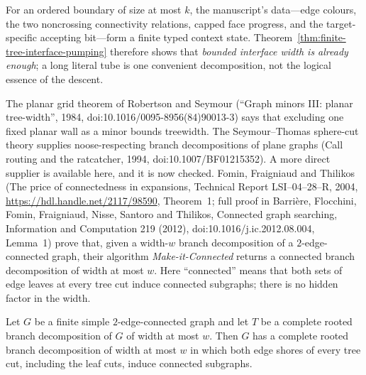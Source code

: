 For an ordered boundary of size at most \(k\), the manuscript's data---edge
colours, the two noncrossing connectivity relations, capped face progress,
and the target-specific accepting bit---form a finite typed context state.
Theorem~\ref{thm:finite-tree-interface-pumping} therefore shows that
\emph{bounded interface width is already enough}; a long literal tube is one
convenient decomposition, not the logical essence of the descent.

The planar grid theorem of Robertson and Seymour
(``Graph minors III: planar tree-width'', 1984,
doi:10.1016/0095-8956(84)90013-3) says that excluding one fixed planar
wall as a minor bounds treewidth.  The Seymour--Thomas sphere-cut theory
supplies noose-respecting branch decompositions of plane graphs
(Call routing and the ratcatcher, 1994,
doi:10.1007/BF01215352).  A more direct supplier is available here, and it
is now checked.
Fomin, Fraigniaud and Thilikos (The price of connectedness in expansions,
Technical Report LSI--04--28--R, 2004,
\url{https://hdl.handle.net/2117/98590}, Theorem~1; full proof in
Barri\`ere, Flocchini, Fomin, Fraigniaud, Nisse, Santoro and Thilikos,
Connected graph searching, Information and Computation 219 (2012),
doi:10.1016/j.ic.2012.08.004, Lemma~1) prove that, given a width-$w$
branch decomposition of a \(2\)-edge-connected graph, their algorithm
\emph{Make-it-Connected} returns a connected branch decomposition of width
at most $w$.  Here ``connected'' means that both sets of edge leaves at
every tree cut induce connected subgraphs; there is no hidden factor in the
width.

\begin{theorem}
\label{thm:width-preserving-connectedization}
Let $G$ be a finite simple \(2\)-edge-connected graph and let $T$ be a
complete rooted branch decomposition of $G$ of width at most $w$.  Then $G$
has a complete rooted branch decomposition of width at most $w$ in which
both edge shores of every tree cut, including the leaf cuts, induce
connected subgraphs.
\end{theorem}

